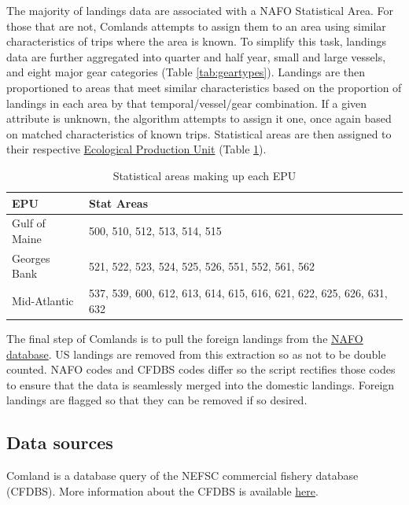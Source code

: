 \documentclass[
]{book}
\begin{document}
The majority of landings data are associated with a NAFO Statistical Area. For those that are not, Comlands attempts to assign them to an area using similar characteristics of trips where the area is known. To simplify this task, landings data are further aggregated into quarter and half year, small and large vessels, and eight major gear categories (Table \ref{tab:geartypes}). Landings are then proportioned to areas that meet similar characteristics based on the proportion of landings in each area by that temporal/vessel/gear combination. If a given attribute is unknown, the algorithm attempts to assign it one, once again based on matched characteristics of known trips. Statistical areas are then assigned to their respective \protect\hyperlink{epu}{Ecological Production Unit} (Table \ref{tab:statareas}).

\begin{table}[H]

\caption{\label{tab:statareas}Statistical areas making up each EPU}
\centering
\begin{tabular}[t]{l|l}
\hline
EPU & Stat Areas\\
\hline
Gulf of Maine & 500, 510, 512, 513, 514, 515\\
\hline
Georges Bank & 521, 522, 523, 524, 525, 526, 551, 552, 561, 562\\
\hline
Mid-Atlantic & 537, 539, 600, 612, 613, 614, 615, 616, 621, 622, 625, 626, 631, 632\\
\hline
\end{tabular}
\end{table}

The final step of Comlands is to pull the foreign landings from the \href{https://www.nafo.int/Data/frames}{NAFO database}. US landings are removed from this extraction so as not to be double counted. NAFO codes and CFDBS codes differ so the script rectifies those codes to ensure that the data is seamlessly merged into the domestic landings. Foreign landings are flagged so that they can be removed if so desired.

\hypertarget{data-sources-20}{%
\subsection{Data sources}\label{data-sources-20}}

Comland is a database query of the NEFSC commercial fishery database (CFDBS). More information about the CFDBS is available \href{https://inport.nmfs.noaa.gov/inport/item/27401}{here}.
\end{document}
